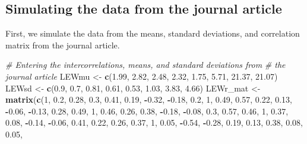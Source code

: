 \documentclass[
  11pt,
]{book}
\newenvironment{Shaded}{\begin{snugshade}}{\end{snugshade}}
\newcommand{\CommentTok}[1]{\textcolor[rgb]{0.37,0.37,0.37}{\textit{#1}}}
\newcommand{\DecValTok}[1]{\textcolor[rgb]{0.06,0.06,0.06}{#1}}
\newcommand{\FloatTok}[1]{\textcolor[rgb]{0.06,0.06,0.06}{#1}}
\newcommand{\FunctionTok}[1]{\textcolor[rgb]{0.27,0.27,0.27}{\textbf{#1}}}
\newcommand{\NormalTok}[1]{#1}
\newcommand{\OtherTok}[1]{\textcolor[rgb]{0.37,0.37,0.37}{#1}}
\newcommand{\SpecialCharTok}[1]{\textcolor[rgb]{0.43,0.43,0.43}{\textbf{#1}}}
\begin{document}
\hypertarget{simulating-the-data-from-the-journal-article}{%
\subsection{Simulating the data from the journal article}\label{simulating-the-data-from-the-journal-article}}

First, we simulate the data from the means, standard deviations, and correlation matrix from the journal article.

\begin{Shaded}
\begin{Highlighting}[]
\CommentTok{\# Entering the intercorrelations, means, and standard deviations from}
\CommentTok{\# the journal article}
\NormalTok{LEWmu }\OtherTok{\textless{}{-}} \FunctionTok{c}\NormalTok{(}\FloatTok{1.99}\NormalTok{, }\FloatTok{2.82}\NormalTok{, }\FloatTok{2.48}\NormalTok{, }\FloatTok{2.32}\NormalTok{, }\FloatTok{1.75}\NormalTok{, }\FloatTok{5.71}\NormalTok{, }\FloatTok{21.37}\NormalTok{, }\FloatTok{21.07}\NormalTok{)}
\NormalTok{LEWsd }\OtherTok{\textless{}{-}} \FunctionTok{c}\NormalTok{(}\FloatTok{0.9}\NormalTok{, }\FloatTok{0.7}\NormalTok{, }\FloatTok{0.81}\NormalTok{, }\FloatTok{0.61}\NormalTok{, }\FloatTok{0.53}\NormalTok{, }\FloatTok{1.03}\NormalTok{, }\FloatTok{3.83}\NormalTok{, }\FloatTok{4.66}\NormalTok{)}
\NormalTok{LEWr\_mat }\OtherTok{\textless{}{-}} \FunctionTok{matrix}\NormalTok{(}\FunctionTok{c}\NormalTok{(}\DecValTok{1}\NormalTok{, }\FloatTok{0.2}\NormalTok{, }\FloatTok{0.28}\NormalTok{, }\FloatTok{0.3}\NormalTok{, }\FloatTok{0.41}\NormalTok{, }\FloatTok{0.19}\NormalTok{, }\SpecialCharTok{{-}}\FloatTok{0.32}\NormalTok{, }\SpecialCharTok{{-}}\FloatTok{0.18}\NormalTok{, }\FloatTok{0.2}\NormalTok{,}
    \DecValTok{1}\NormalTok{, }\FloatTok{0.49}\NormalTok{, }\FloatTok{0.57}\NormalTok{, }\FloatTok{0.22}\NormalTok{, }\FloatTok{0.13}\NormalTok{, }\SpecialCharTok{{-}}\FloatTok{0.06}\NormalTok{, }\SpecialCharTok{{-}}\FloatTok{0.13}\NormalTok{, }\FloatTok{0.28}\NormalTok{, }\FloatTok{0.49}\NormalTok{, }\DecValTok{1}\NormalTok{, }\FloatTok{0.46}\NormalTok{, }\FloatTok{0.26}\NormalTok{,}
    \FloatTok{0.38}\NormalTok{, }\SpecialCharTok{{-}}\FloatTok{0.18}\NormalTok{, }\SpecialCharTok{{-}}\FloatTok{0.08}\NormalTok{, }\FloatTok{0.3}\NormalTok{, }\FloatTok{0.57}\NormalTok{, }\FloatTok{0.46}\NormalTok{, }\DecValTok{1}\NormalTok{, }\FloatTok{0.37}\NormalTok{, }\FloatTok{0.08}\NormalTok{, }\SpecialCharTok{{-}}\FloatTok{0.14}\NormalTok{, }\SpecialCharTok{{-}}\FloatTok{0.06}\NormalTok{, }\FloatTok{0.41}\NormalTok{,}
    \FloatTok{0.22}\NormalTok{, }\FloatTok{0.26}\NormalTok{, }\FloatTok{0.37}\NormalTok{, }\DecValTok{1}\NormalTok{, }\FloatTok{0.05}\NormalTok{, }\SpecialCharTok{{-}}\FloatTok{0.54}\NormalTok{, }\SpecialCharTok{{-}}\FloatTok{0.28}\NormalTok{, }\FloatTok{0.19}\NormalTok{, }\FloatTok{0.13}\NormalTok{, }\FloatTok{0.38}\NormalTok{, }\FloatTok{0.08}\NormalTok{, }\FloatTok{0.05}\NormalTok{,}

\end{Highlighting}
\end{Shaded}
\end{document}
